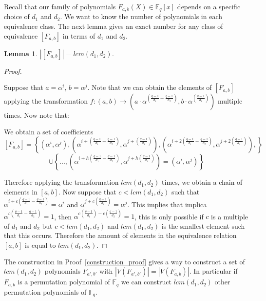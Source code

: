 \documentclass{article}
\newtheorem{lemma}[theorem]{Lemma}
\theoremstyle{definition}
\theoremstyle{remark}
\numberwithin{equation}{section}
\begin{document}
Recall that our family of polynomials $F_{a,b}(X) \in \mathbb{F}_{q}[x]$ depends on a specific choice of $d_1$ and $d_2$. We want to know the number of polynomials in each equivalence class. The next lemma gives an exact number for any class of equivalence $[F_{a,b}]$ in terms of $d_1$ and $d_2$.

\begin{lemma}
  
  $|[F_{a, b}]| = lcm(d_1,d_2)$.

\end{lemma}

\begin{proof}\label{construction_proof}

  Suppose that $a=\alpha^i$, $b=\alpha^j$. Note that we can obtain the elements of $[F_{a,b}]$ applying the transformation $f:(a,b) \rightarrow ( a\cdot\alpha^{(\frac{q-1}{d_1} - \frac{q-1}{d_2})}, b\cdot\alpha^{(\frac{q-1}{d_1})} )$ multiple times. Now note that:

  We obtain a set of coefficients 
  $$[F_{a,b}] = \left\{ (\alpha^i,\alpha^j), (\alpha^{i+(\frac{q-1}{d_1} - \frac{q-1}{d_2})}, \alpha^{j+(\frac{q-1}{d_1})}), (\alpha^{i+2(\frac{q-1}{d_1} - \frac{q-1}{d_2})}, \alpha^{j+2(\frac{q-1}{d_1})}),\right\}$$ 
  $$ \cup \left\{..., (\alpha^{i+h(\frac{q-1}{d_1} - \frac{q-1}{d_2})}, \alpha^{j+h(\frac{q-1}{d_1})}) = (\alpha^i, \alpha^j) \right\}$$

  Therefore applying the transformation $lcm(d_1,d_2)$ times, we obtain a chain of elements in $[a,b]$. Now suppose that $c < lcm(d_1,d_2)$ such that $\alpha^{i+c(\frac{q-1}{d_1} - \frac{q-1}{d_2})} = \alpha^i$ and $\alpha^{j+c(\frac{q-1}{d_1})} = \alpha^j$. This implies that implica $\alpha^{c(\frac{q-1}{d_1} - \frac{q-1}{d_2})} = 1$, then $\alpha^{c(\frac{q-1}{d_1}) - c(\frac{q-1}{d_2})} = 1$, this is only possible if $c$ is a multiple of $d_1$ and $d_2$ but $c < lcm(d_1,d_2)$ and $lcm(d_1,d_2)$ is the smallest element such that this occurs. Therefore the amount of elements in the equivalence relation $[a,b]$ is equal to $lcm(d_1,d_2)$.
  
\end{proof}

The construction in Proof~\ref{construction_proof} gives a way to construct a set of $lcm(d_1,d_2)$ polynomials $F_{a',b'}$ with $|V(F_{a',b'})| = |V(F_{a,b})|$. In particular if $F_{a,b}$ is a permutation polynomial of $\mathbb{F}_q$ we can construct $lcm(d_1, d_2)$ other permutation polynomials of $\mathbb{F}_q$.
\end{document}
